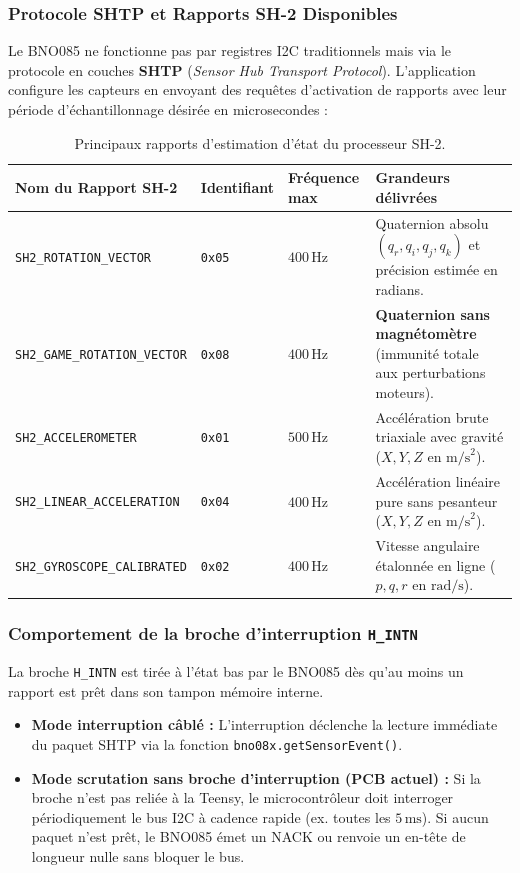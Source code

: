 \documentclass[../Materiel.tex]{subfiles}
\begin{document}
\subsubsection{Protocole SHTP et Rapports SH-2 Disponibles}
Le BNO085 ne fonctionne pas par registres I2C traditionnels mais via le protocole en couches \textbf{SHTP} (\textit{Sensor Hub Transport Protocol}). L'application configure les capteurs en envoyant des requêtes d'activation de rapports avec leur période d'échantillonnage désirée en microsecondes :

\begin{table}[htbp]
\centering
\small
\begin{tabular}{p{5.5cm} p{2.2cm} p{2.2cm} p{5.5cm}}
\toprule
\textbf{Nom du Rapport SH-2} & \textbf{Identifiant} & \textbf{Fréquence max} & \textbf{Grandeurs délivrées} \\
\midrule
\texttt{SH2\_ROTATION\_VECTOR} & \texttt{0x05} & $400\,\text{Hz}$ & Quaternion absolu $(q_r, q_i, q_j, q_k)$ et précision estimée en radians. \\
\addlinespace
\texttt{SH2\_GAME\_ROTATION\_VECTOR} & \texttt{0x08} & $400\,\text{Hz}$ & \textbf{Quaternion sans magnétomètre} (immunité totale aux perturbations moteurs). \\
\addlinespace
\texttt{SH2\_ACCELEROMETER} & \texttt{0x01} & $500\,\text{Hz}$ & Accélération brute triaxiale avec gravité ($X, Y, Z$ en $\text{m/s}^2$). \\
\addlinespace
\texttt{SH2\_LINEAR\_ACCELERATION} & \texttt{0x04} & $400\,\text{Hz}$ & Accélération linéaire pure sans pesanteur ($X, Y, Z$ en $\text{m/s}^2$). \\
\addlinespace
\texttt{SH2\_GYROSCOPE\_CALIBRATED} & \texttt{0x02} & $400\,\text{Hz}$ & Vitesse angulaire étalonnée en ligne ($p, q, r$ en $\text{rad/s}$). \\
\bottomrule
\end{tabular}
\caption{Principaux rapports d'estimation d'état du processeur SH-2.}
\end{table}

\subsubsection{Comportement de la broche d'interruption \texttt{H\_INTN}}
La broche \texttt{H\_INTN} est tirée à l'état bas par le BNO085 dès qu'au moins un rapport est prêt dans son tampon mémoire interne. 
\begin{itemize}
    \item \textbf{Mode interruption câblé :} L'interruption déclenche la lecture immédiate du paquet SHTP via la fonction \texttt{bno08x.getSensorEvent()}.
    \item \textbf{Mode scrutation sans broche d'interruption (PCB actuel) :} Si la broche n'est pas reliée à la Teensy, le microcontrôleur doit interroger périodiquement le bus I2C à cadence rapide (ex. toutes les $5\,\text{ms}$). Si aucun paquet n'est prêt, le BNO085 émet un NACK ou renvoie un en-tête de longueur nulle sans bloquer le bus.
\end{itemize}
\end{document}
